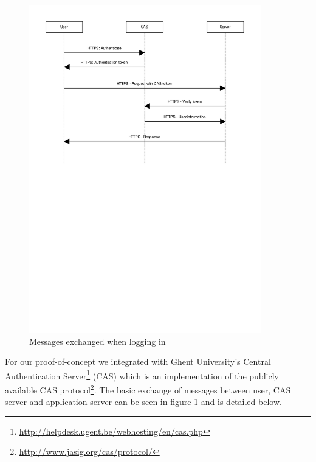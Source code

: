 \documentclass{article}
\begin{document}
\begin{figure}
  \begin{center}
  \includegraphics[width=0.9\textwidth]{images/login.pdf}
  \caption{Messages exchanged when logging in}
  \label{fig:login}
  \end{center}
\end{figure}

For our proof-of-concept we integrated with Ghent University's Central
Authentication Server\footnote{\url{http://helpdesk.ugent.be/webhosting/en/cas.php}}
(CAS) which is an implementation of the publicly available CAS
protocol\footnote{\url{http://www.jasig.org/cas/protocol/}}. The basic
exchange of messages between user, CAS server and application server can be seen
in figure \ref{fig:login} and is detailed below.
\end{document}
